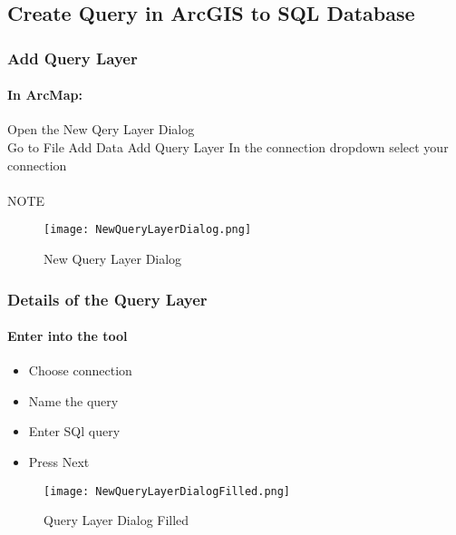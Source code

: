 \documentclass[class=article , crop=false, titlepage, twoside, multi={itemize, figure, verbatim}, float=false]{standalone}
\title{}  %
\begin{document}
\ifstandalone
\maketitle %
\tableofcontents %
\clearpage
\fi

\subsection{Create Query in ArcGIS to SQL Database}
\medskip
\subsubsection[Add Query Layer ]{\Large Add Query Layer}
\paragraph*{In ArcMap: \texorpdfstring{\\}{}}
Open the New Qery Layer Dialog\\
Go to File Add Data Add Query Layer
In the connection dropdown select your connection
\paragraph*{}NOTE
\begin{figure}[h!]
\centering
    \texttt{[image: NewQueryLayerDialog.png]}
\caption{New Query Layer Dialog}
\end{figure}
\clearpage
\subsubsection[Details of the Query Layer]{\Large Details of the Query Layer}
\paragraph*{Enter into the tool \texorpdfstring{\\}{}}
\begin{itemize}
  \item Choose connection
  \item Name the query
  \item Enter SQl query
  \item Press Next
\end{itemize}
\begin{figure}[h!]
\centering
    \texttt{[image: NewQueryLayerDialogFilled.png]}
\caption{Query Layer Dialog Filled}
\end{figure}
\clearpage
\end{document}
